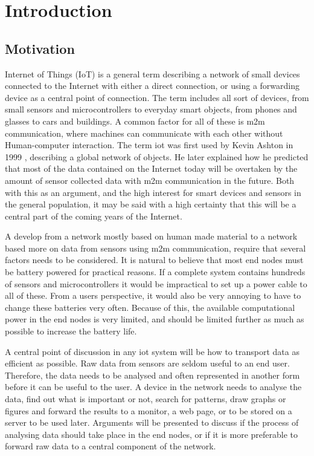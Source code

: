 \chapter{Introduction}
\label{chp:introduction} 


\section{Motivation}

\noindent Internet of Things (IoT) is a general term describing a network of small devices connected to the Internet with either a direct connection, or using a forwarding device as a central point of connection. The term includes all sort of devices, from small sensors and microcontrollers to everyday smart objects, from phones and glasses to cars and buildings. A common factor for all of these is \gls{m2m} communication, where machines can communicate with each other without Human-computer interaction. The term \gls{iot} was first used by Kevin Ashton in 1999 \cite{ashton2009internet}, describing a global network of objects. He later explained how he predicted that most of the data contained on the Internet today will be overtaken by the amount of sensor collected data with \gls{m2m} communication in the future. Both with this as an argument, and the high interest for smart devices and sensors in the general population, it may be said with a high certainty that this will be a central part of the coming years of the Internet. 

\noindent A develop from a network mostly based on human made material to a network based more on data from sensors using \gls{m2m} communication, require that several factors needs to be considered. It is natural to believe that most end nodes must be battery powered for practical reasons. If a complete system contains hundreds of sensors and \glspl{microcontroller} it would be impractical to set up a power cable to all of these. From a users perspective, it would also be very annoying to have to change these batteries very often. Because of this, the available computational power in the end nodes is very limited, and should be limited further as much as possible to increase the battery life. 

\noindent A central point of discussion in any \gls{iot} system will be how to transport data as efficient as possible. Raw data from sensors are seldom useful to an end user. Therefore, the data needs to be analysed and often represented in another form before it can be useful to the user. A device in the network needs to analyse the data, find out what is important or not, search for patterns, draw graphs or figures and forward the results to a monitor, a web page, or to be stored on a server to be used later. Arguments will be presented to discuss if the process of analysing data should take place in the end nodes, or if it is more preferable to forward raw data to a central component of the network. 

